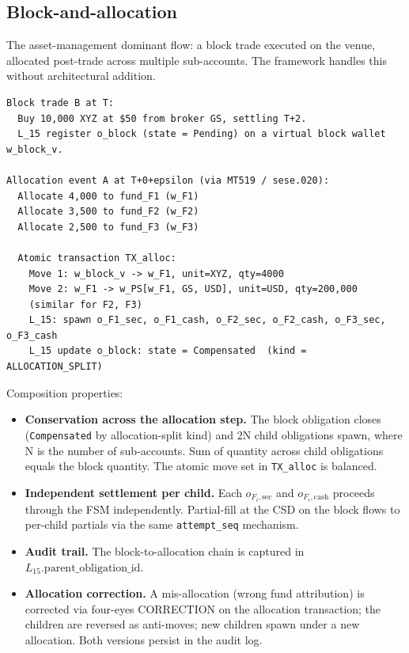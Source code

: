 \documentclass[11pt,a4paper]{article}
\begin{document}
\subsection{Block-and-allocation}
\label{sec:composition-block}

The asset-management dominant flow: a block trade executed on the venue, allocated post-trade across multiple sub-accounts. The framework handles this without architectural addition.

\begin{lstlisting}
Block trade B at T:
  Buy 10,000 XYZ at $50 from broker GS, settling T+2.
  L_15 register o_block (state = Pending) on a virtual block wallet w_block_v.

Allocation event A at T+0+epsilon (via MT519 / sese.020):
  Allocate 4,000 to fund_F1 (w_F1)
  Allocate 3,500 to fund_F2 (w_F2)
  Allocate 2,500 to fund_F3 (w_F3)

  Atomic transaction TX_alloc:
    Move 1: w_block_v -> w_F1, unit=XYZ, qty=4000
    Move 2: w_F1 -> w_PS[w_F1, GS, USD], unit=USD, qty=200,000
    (similar for F2, F3)
    L_15: spawn o_F1_sec, o_F1_cash, o_F2_sec, o_F2_cash, o_F3_sec, o_F3_cash
    L_15 update o_block: state = Compensated  (kind = ALLOCATION_SPLIT)
\end{lstlisting}

Composition properties:
\begin{itemize}[nosep]
\item \textbf{Conservation across the allocation step.} The block obligation closes (\texttt{Compensated} by allocation-split kind) and 2N child obligations spawn, where N is the number of sub-accounts. Sum of quantity across child obligations equals the block quantity. The atomic move set in \texttt{TX\_alloc} is balanced.
\item \textbf{Independent settlement per child.} Each $o_{F_i,\mathrm{sec}}$ and $o_{F_i,\mathrm{cash}}$ proceeds through the FSM independently. Partial-fill at the CSD on the block flows to per-child partials via the same \texttt{attempt\_seq} mechanism.
\item \textbf{Audit trail.} The block-to-allocation chain is captured in $L_{15}.\mathrm{parent\_obligation\_id}$.
\item \textbf{Allocation correction.} A mis-allocation (wrong fund attribution) is corrected via four-eyes CORRECTION on the allocation transaction; the children are reversed as anti-moves; new children spawn under a new allocation. Both versions persist in the audit log.
\end{itemize}
\end{document}
